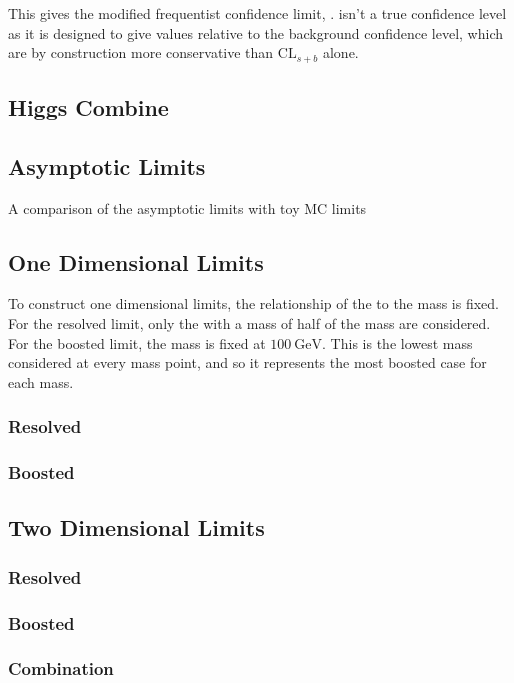 This gives the modified frequentist confidence limit, \CLs. \CLs isn't a true confidence level as it is designed to give values relative to the background confidence level, which are by construction more conservative than $\mathrm{CL}_{s+b}$ alone.

\subsection{Higgs Combine}

\subsection{Asymptotic Limits}
\label{sec:asymp_limits}
A comparison of the asymptotic limits with toy MC limits

\subsection{One Dimensional Limits}
To construct one dimensional limits, the relationship of the \NR to the \WR mass is fixed. For the resolved limit, only the \NR with a mass of half of the \WR mass are considered. For the boosted limit, the \NR mass is fixed at \ensuremath{\SI{100}{\GeV}}. This is the lowest mass \NR considered at every \WR mass point, and so it represents the most boosted \WR case for each \WR mass.
\subsubsection{Resolved}

\subsubsection{Boosted}

\subsection{Two Dimensional Limits}
\subsubsection{Resolved}
\subsubsection{Boosted}
\subsubsection{Combination}



\label{ch:limit_setting}